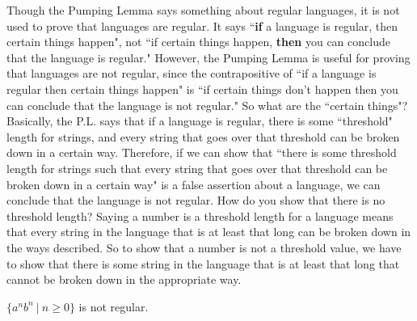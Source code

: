 Though the Pumping Lemma says something about regular languages, it is not used
to prove that languages are regular.  It says ``{\bf if} a language is regular,
then certain things happen", not ``if certain things happen, {\bf then} you can conclude
that the language is regular."  However, the Pumping Lemma is useful for
proving that languages are not regular, since the contrapositive of ``if a
language is regular
then certain things happen" is ``if certain things don't happen then you can conclude
that the language is not regular."  So what are the ``certain things"?  
Basically,
the P.L. says that if a language is regular, there is some ``threshold" 
length for
strings, and every string that goes over that threshold can be broken down in a
certain way.  Therefore, if we can show that ``there is some threshold length for
strings such that every string that goes over that threshold can be broken down in a 
certain way" is a false assertion about a language, we can conclude that the
language is not regular. How do you show that there is no threshold length? 
Saying a number is a threshold length for a language means that every string in
the language that is at least that long can be broken down in the ways
described.  So to show that a number is not a threshold value, we have to show
that there is some string in the language that is at least that long that cannot
be broken down in the appropriate way.

\begin{theorem}
$\{ a^nb^n \ | \ n \geq 0 \}$ is not regular.
\end{theorem}

